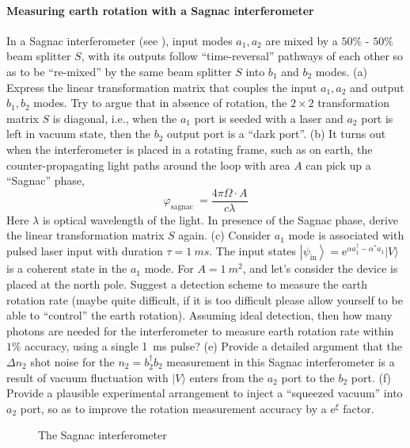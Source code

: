 \documentclass[hyperref, a4paper]{article}
\newcommand*{\ee}{\mathrm{e}}
\begin{document}
\paragraph{Measuring earth rotation with a Sagnac interferometer} In a Sagnac interferometer (see ), input modes ${a}_{1}, {a}_{2}$ are mixed by a $50 \%$ - $50 \%$ beam splitter $S$, with its outputs follow ``time-reversal'' pathways of each other so as to be ``re-mixed'' by the same beam splitter $S$ into ${b}_{1}$ and ${b}_{2}$ modes.
(a) Express the linear transformation matrix that couples the input $a_{1}, a_{2}$ and output ${b}_{1}, {b}_{2}$ modes. Try to argue that in absence of rotation, the $2 \times 2$ transformation matrix ${S}$ is diagonal, i.e., when the $a_1$ port is seeded with a laser and $a_2$ port is left in vacuum state, then the $b_2$ output port is a ``dark port''.
(b) It turns out when the interferometer is placed in a rotating frame, such as on earth, the counter-propagating light paths around the loop with area $A$ can pick up a ``Sagnac'' phase,
\[
\varphi_{\text {sagnac }}=\frac{4 \pi \Omega \cdot A}{c \lambda}
\]
Here $\lambda$ is optical wavelength of the light. In presence of the Sagnac phase, derive the linear transformation matrix ${S}$ again.
(c) Consider $a_{1}$ mode is associated with pulsed laser input with duration $\tau=\SI{1}{ms}$.
The input states $\left|\psi_{\text{in}}\right\rangle=\ee^{\alpha a_{1}^{\dagger}-\alpha^{*} a_{1}}|V\rangle$ is a coherent state in the $a_{1}$ mode. For ${A}=\SI{1}{m^2}$, and let's consider the device is placed at the north pole. Suggest a detection scheme to measure the earth rotation rate (maybe quite difficult, if it is too difficult please allow yourself to be able to ``control'' the earth rotation). Assuming ideal detection, then how many photons are needed for the interferometer to measure earth rotation rate within $1 \%$ accuracy, using a single \SI{1}{ms} pulse?
(e) Provide a detailed argument that the $\Delta {n}_{2}$ shot noise for the ${n}_{2}=b_{2}^{\dagger} b_{2}$ measurement in this Sagnac interferometer is a result of vacuum fluctuation with $|V\rangle$ enters from the $a_{2}$ port to the $b_{2}$ port.
(f) Provide a plausible experimental arrangement to inject a ``squeezed vacuum'' into $a_{2}$ port, so as to improve the rotation measurement accuracy by a $\mathrm{e}^{\xi}$ factor.

\begin{figure}
    \centering
    
    \caption{The Sagnac interferometer}
    \label{fig:sagnac-device}
\end{figure}
\end{document}
